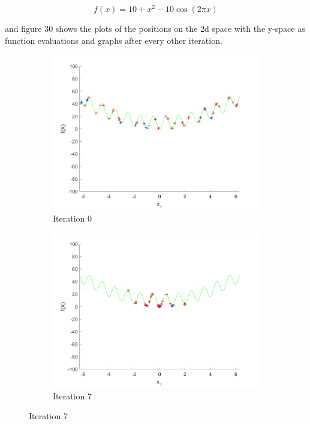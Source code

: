 $$
  f(x) = 10 + x^2 - 10 \cos(2\pi x)
$$

and figure 30 shows the plots of the positions on the 2d space with the y-space as function evaluations and graphs after every other iteration.

\begin{figure}
  \begin{subfigure}[b]{0.4\textwidth}
    \includegraphics[width=\textwidth]{img/smpl/rast1d/loa-iter-0}
    \caption{Iteration 0}
    \label{fig:s3-iter-0}
  \end{subfigure}
  \begin{subfigure}[b]{0.4\textwidth}
    \includegraphics[width=\textwidth]{img/smpl/rast1d/loa-iter-7}
    \caption{Iteration 7}

\end{subfigure}
\end{figure}
